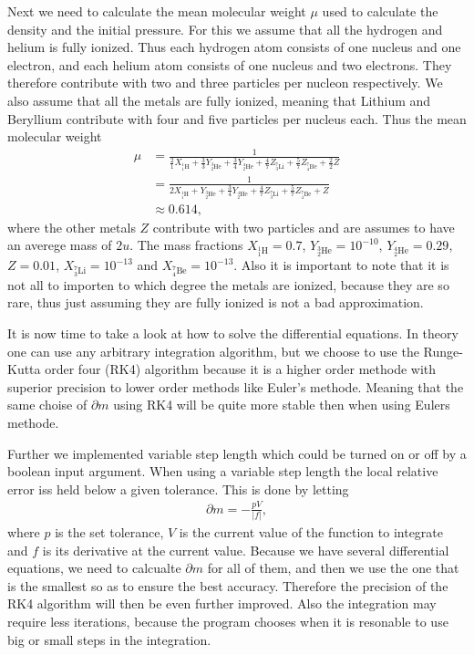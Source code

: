 \documentclass{emulateapj}
\begin{document}
	Next we need to calculate the mean molecular weight $\mu$ used to calculate the density and the initial pressure. For this we assume that all the hydrogen and helium is fully ionized. Thus each hydrogen atom consists of one nucleus and one electron, and each helium atom consists of one nucleus and two electrons. They therefore contribute with two and three particles per nucleon respectively. We also assume that all the metals are fully ionized, meaning that Lithium and Beryllium contribute with four and five particles per nucleus each.
	Thus the mean molecular weight 
	\begin{align}
		\mu &= \frac{1}{\frac{2}{1}X_{^1_1\text{H}} + \frac{3}{3}Y_{^3_2\text{He}} + \frac{3}{4}Y_{^4_2\text{He}} + \frac{4}{7}Z_{^7_3 \text{Li}} + \frac{5}{7}Z_{^7_4\text{Be}} + \frac{2}{2}Z}\\
		&=\frac{1}{2X_{^1_1\text{H}} + Y_{^3_2\text{He}} + \frac{3}{4}Y_{^4_2\text{He}} + \frac{4}{7}Z_{^7_3 \text{Li}} + \frac{5}{7}Z_{^7_4\text{Be}} + Z}\\ 
		& \approx 0.614,
	\end{align}
	where the other metals $Z$ contribute with two particles and are assumes to have an averege mass of $2u$. The mass fractions $X_{^1_1\text{H}} = 0.7$, $Y_{^3_2\text{He}} = 10^{-10}$, $Y_{^4_2\text{He}} = 0.29$, $Z = 0.01$, $X_{^7_3\text{Li}} = 10^{-13}$ and $X_{^7_4\text{Be}} = 10^{-13}$. Also it is important to note that it is not all to importen to which degree the metals are ionized, because they are so rare, thus just assuming they are fully ionized is not a bad approximation.

	It is now time to take a look at how to solve the differential equations. In theory one can use any arbitrary integration algorithm, but we choose to use the Runge-Kutta order four (RK4) algorithm because it is a higher order methode with superior precision to lower order methods like Euler's methode. Meaning that the same choise of $\partial m$ using RK4 will be quite more stable then when using Eulers methode. 
	
	Further we implemented variable step length which could be turned on or off by a boolean input argument. When using a variable step length the local relative error iss held below a given tolerance. This is done by letting 
	\begin{align}
		\partial m = - \frac{pV}{|f|}, 
	\end{align}
	where $p$ is the set tolerance, $V$ is the current value of the function to integrate and $f$ is its derivative at the current value. Because we have several differential equations, we need to calcualte $\partial m$ for all of them, and then we use the one that is the smallest so as to ensure the best accuracy.
	Therefore the precision of the RK4 algorithm will then be even further improved. Also the integration may require less iterations, because the program chooses when it is resonable to use big or small steps in the integration.   
	
\end{document}

